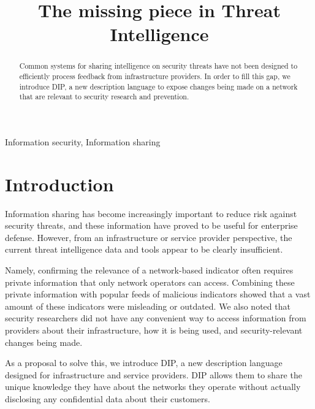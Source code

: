 \documentclass[conference]{IEEEtran}
\begin{document}
\title{The missing piece in Threat Intelligence}

\author{
}

\maketitle

\begin{abstract}
Common systems for sharing intelligence on security threats have not been designed to efficiently process feedback from infrastructure providers.
In order to fill this gap, we introduce DIP, a new description language to expose changes being made on a network that are relevant to security research and prevention.
\end{abstract}

\begin{IEEEkeywords}
Information security, Information sharing
\end{IEEEkeywords}

\IEEEpeerreviewmaketitle

\section{Introduction}
Information sharing has become increasingly important to reduce risk against security threats, and these information have proved to be useful for enterprise defense. However, from an infrastructure or service provider perspective, the current threat intelligence data and tools appear to be clearly insufficient.

Namely, confirming the relevance of a network-based indicator often requires private information that only network operators can access.
Combining these private information with popular feeds of malicious indicators showed that a vast amount of these indicators were misleading or outdated.
We also noted that security researchers did not have any convenient way to access information from providers about their infrastructure, how it is being used, and security-relevant changes being made.

As a proposal to solve this, we introduce DIP, a new description language designed for infrastructure and service providers. DIP allows them to share the unique knowledge they have about the networks they operate without actually disclosing any confidential data about their customers.
 
\end{document}

